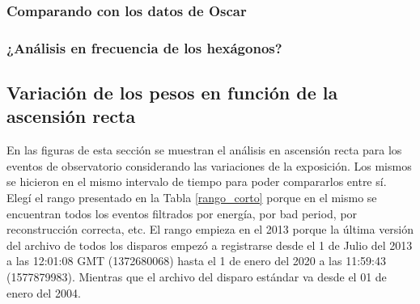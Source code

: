 


\subsubsection{Comparando con los datos de Oscar}

\subsubsection{¿Análisis en frecuencia de los hexágonos?}




\subsection{Variación de los pesos en función de la ascensión recta}
En las figuras de esta sección se muestran el análisis en ascensión recta para los eventos de observatorio considerando las variaciones de la exposición. 
Los mismos se hicieron en el mismo intervalo de tiempo para poder compararlos entre sí. Elegí el rango presentado en la Tabla \ref{rango_corto}  porque en el mismo se encuentran todos los eventos filtrados por energía, por bad period, por reconstrucción correcta, etc. El rango empieza en el 2013 porque la última versión del archivo de todos los disparos empezó a registrarse desde el  1 de Julio del 2013 a las 12:01:08 GMT (1372680068) hasta el  1 de enero del 2020 a las 11:59:43 (1577879983). Mientras que el archivo del disparo estándar va desde el 01 de enero del 2004.

